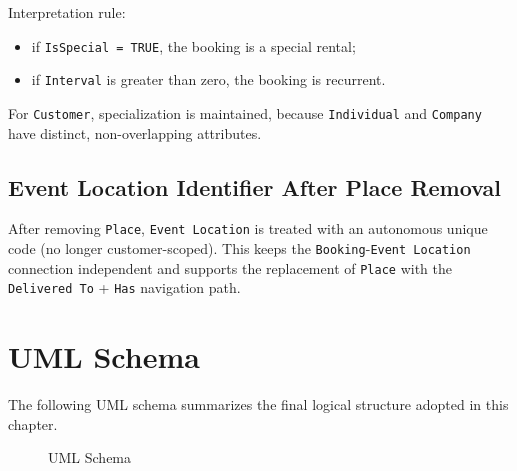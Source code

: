 Interpretation rule:

\begin{itemize}
    \item if \texttt{IsSpecial = TRUE}, the booking is a special rental;
    \item if \texttt{Interval} is greater than zero, the booking is recurrent.
\end{itemize}

For \texttt{Customer}, specialization is maintained, because \texttt{Individual} and \texttt{Company} have distinct, non-overlapping attributes.

\subsection*{Event Location Identifier After Place Removal}

After removing \texttt{Place}, \texttt{Event Location} is treated with an autonomous unique code (no longer customer-scoped). This keeps the \texttt{Booking}-\texttt{Event Location} connection independent and supports the replacement of \texttt{Place} with the \texttt{Delivered To} + \texttt{Has} navigation path.

\section*{UML Schema}

The following UML schema summarizes the final logical structure adopted in this chapter.

\begin{figure}[H]
    \centering
    \caption{UML Schema}
\end{figure}







